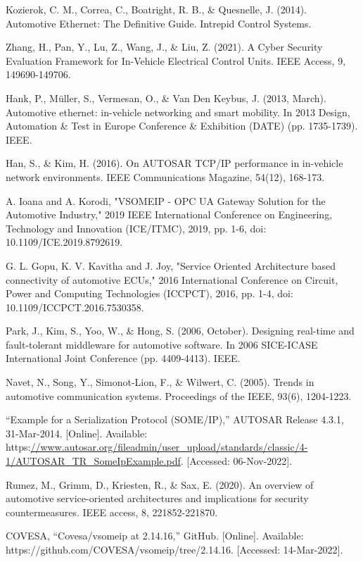 \documentclass[a4paper, 12pt, oneside, BCOR1cm,toc=chapterentrywithdots]{scrbook}
\begin{document}
\begin{thebibliography}{00}
Kozierok, C. M., Correa, C., Boatright, R. B., \& Quesnelle, J. (2014). Automotive Ethernet: The Definitive Guide. Intrepid Control Systems.

Zhang, H., Pan, Y., Lu, Z., Wang, J., \& Liu, Z. (2021). A Cyber Security Evaluation Framework for In-Vehicle Electrical Control Units. IEEE Access, 9, 149690-149706.

Hank, P., Müller, S., Vermesan, O., \& Van Den Keybus, J. (2013, March). Automotive ethernet: in-vehicle networking and smart mobility. In 2013 Design, Automation \& Test in Europe Conference \& Exhibition (DATE) (pp. 1735-1739). IEEE.

Han, S., \& Kim, H. (2016). On AUTOSAR TCP/IP performance in in-vehicle network environments. IEEE Communications Magazine, 54(12), 168-173.

A. Ioana and A. Korodi, "VSOMEIP - OPC UA Gateway Solution for the Automotive Industry," 2019 IEEE International Conference on Engineering, Technology and Innovation (ICE/ITMC), 2019, pp. 1-6, doi: 10.1109/ICE.2019.8792619.

G. L. Gopu, K. V. Kavitha and J. Joy, "Service Oriented Architecture based connectivity of automotive ECUs," 2016 International Conference on Circuit, Power and Computing Technologies (ICCPCT), 2016, pp. 1-4, doi: 10.1109/ICCPCT.2016.7530358.

Park, J., Kim, S., Yoo, W., \& Hong, S. (2006, October). Designing real-time and fault-tolerant middleware for automotive software. In 2006 SICE-ICASE International Joint Conference (pp. 4409-4413). IEEE.

Navet, N., Song, Y., Simonot-Lion, F., \& Wilwert, C. (2005). Trends in automotive communication systems. Proceedings of the IEEE, 93(6), 1204-1223.

“Example for a Serialization Protocol (SOME/IP),” AUTOSAR Release 4.3.1, 31-Mar-2014. [Online]. Available: https:\url{//www.autosar.org/fileadmin/user\_upload/standards/classic/4-1/AUTOSAR\_TR\_SomeIpExample.pdf}. [Accessed: 06-Nov-2022]. 

Rumez, M., Grimm, D., Kriesten, R., \& Sax, E. (2020). An overview of automotive service-oriented architectures and implications for security countermeasures. IEEE access, 8, 221852-221870.

COVESA, “Covesa/vsomeip at 2.14.16,” GitHub. [Online]. Available: https://github.com/COVESA/vsomeip/tree/2.14.16. [Accessed: 14-Mar-2022]. 


\end{thebibliography}
\end{document}
